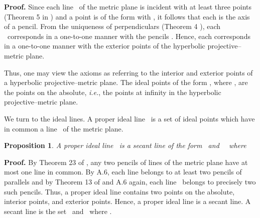 \documentclass[a4paper,twoside,12pt]{article}
\newtheorem{prop}{Proposition}[section]
\newenvironment{proof}{\medskip \noindent 
            {\bf Proof.}}{ \hfill \myHighlight{$\square$}\coordHE{} \medskip}
\begin{document}
\begin{proof} Since each line \coordHE{}\ of the metric plane is incident with at
least three points (Theorem 5 in \cite{BBPW}) and a point is of the form \coordHE{}
with \coordHE{}, it follows that each \coordHE{} is the axis of a 
pencil. From the uniqueness of perpendiculars (Theorem 4 \cite{BBPW}), 
each \coordHE{}\ corresponds in a one-to-one manner with the 
pencils \coordHE{}. Hence, each \coordHE{} corresponds in a one-to-one 
manner with the exterior points of the hyperbolic projective--metric plane.
\end{proof}

     Thus, one may view the axioms as referring to the interior and exterior
points of a hyperbolic projective--metric plane. The ideal points of the
form \coordHE{}, where \coordHE{}, are the points on the
absolute, {\it i.e.}, the points at infinity in the hyperbolic
projective--metric plane.

     We turn to the ideal lines. A proper ideal line \coordHE{}\ is a set of
ideal points which have in common a line \coordHE{}\ of the metric plane.

\begin{prop} A proper ideal line \coordHE{}\ is a secant line of the
form \newline
{}\coordHE{}\ and \coordHE{}\ \
where \coordHE{}
\end{prop}

\begin{proof} By Theorem 23 of \cite{BBPW}, any two pencils of lines of the
metric plane have at most one line in common. By A.6, each line belongs to at
least two pencils of parallels and by Theorem 13 of \cite{BBPW} and A.6 
again, each line \myHighlight{$g\in \mathcal{G}$}\coordHE{}\ belongs to precisely two such pencils. 
Thus, a proper ideal line contains two points on the absolute, interior 
points, and exterior points. Hence, a proper ideal line is a secant line. 
A secant line is the set \newline
{}\coordHE{}\ and \myHighlight{$abc\in 
\mathcal{G}$}\coordHE{}\ where \myHighlight{$a\parallel b\}$}\coordHE{}.
\end{proof}
\end{document}

